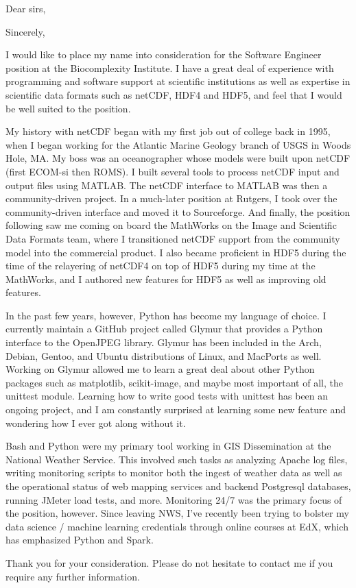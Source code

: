 \documentclass[11pt]{moderncv}  %
\begin{document}
\makecvtitle

\opening{Dear sirs,}
\closing{Sincerely,}


\makelettertitle

I would like to place my name into consideration for the Software Engineer position at the Biocomplexity Institute.   I have a great deal of experience with programming and software support at scientific institutions as well as expertise in scientific data formats such as netCDF, HDF4 and HDF5, and feel that I would be well suited to the position.

My history with netCDF began with my first job out of college back in 1995, 
when I began working for the Atlantic Marine Geology branch of USGS in Woods Hole,
MA.  My boss was an oceanographer whose models were built upon netCDF (first ECOM-si then ROMS).  I built several tools to process netCDF input and output files using
MATLAB.  The netCDF interface to MATLAB was then a community-driven project.
In a much-later position at Rutgers, I took over the community-driven interface
and moved it to Sourceforge.  And finally, the position following saw me
coming on board the MathWorks on the Image and Scientific Data Formats team, where I transitioned netCDF support from the community model into the commercial product.  I also became proficient in HDF5 during the time of the relayering of netCDF4 on top of HDF5 during my time at the MathWorks, and I authored new features for HDF5 as well as improving old features.

In the past few years, however, Python has become my language of choice.  I currently
maintain a GitHub project called Glymur that provides a Python interface
to the OpenJPEG library.  Glymur has been included in the Arch, Debian,
Gentoo, and Ubuntu distributions of Linux, and MacPorts as well.
Working on Glymur allowed me to learn a great deal about other Python
packages such as matplotlib, scikit-image, and maybe most important of
all, the unittest module.  Learning how to write good tests with unittest
has been an ongoing project, and I am constantly surprised at learning
some new feature and wondering how I ever got along without it.

Bash and Python were my primary tool working in GIS Dissemination at the National
Weather Service.  This involved such tasks as analyzing Apache log
files, writing monitoring scripts to monitor both the ingest of weather data as well as the operational status of web mapping services and backend Postgresql databases, running JMeter load tests, and more.
Monitoring 24/7 was the primary focus of the position, however.  Since
leaving NWS, I've recently been trying to bolster my data science /
machine learning credentials through online courses at EdX, which has
emphasized Python and Spark.

Thank you for your consideration.  Please do not hesitate to contact
me if you require any further information.

\makeletterclosing
\end{document}
